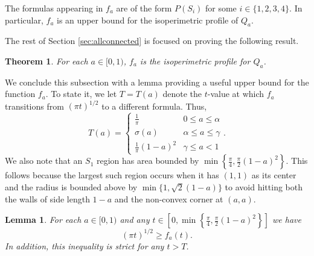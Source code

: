\documentclass[leqno]{article}
\numberwithin{equation}{section}
\newtheorem{theorem}[equation]{Theorem}
\theoremstyle{definition}
\theoremstyle{remark}
\theoremstyle{plain}
\newtheorem{lemma}[equation]{Lemma}
\begin{document}
The formulas appearing in $f_a$ are of the form $P(S_i)$ for some $i\in \{1,2,3,4\}$.  In particular, $f_a$ is an upper bound for the isoperimetric profile of $Q_a$.

The rest of Section \ref{sec:allconnected} is focused on proving the following result.

\begin{theorem}\label{thm:iso} For each $a\in [0,1)$, $f_a$ is the isoperimetric profile for $Q_a$.

\end{theorem}

We conclude this subsection with a lemma providing a useful upper bound for the function $f_a$. To state it, we let $T = T(a)$ denote the $t$-value at which $f_a$ transitions from $(\pi t)^{1/2}$ to a different formula.  Thus,
\[
    T(a) =
    \begin{cases}
        \frac{1}{\pi} & 0\leq a \leq \alpha \\
        \sigma (a) & \alpha \leq a \leq \gamma \\
        \frac{1}{\pi}(1-a)^2 & \gamma \leq a < 1
    \end{cases}.
\]
We also note that an $S_1$ region has area bounded by $\min\left\{\frac{\pi}{4}, \frac{\pi}{2}(1-a)^2\right\}$.  This follows because the largest such region occurs when it has $(1,1)$ as its center and the radius is bounded above by $\min\{1, \sqrt{2}(1-a)\}$ to avoid hitting both the walls of side length $1-a$ and the non-convex corner at $(a,a)$.




\begin{lemma}\label{lem:ffacts}For each $a\in [0,1)$ and any $t\in \left[0,\min\left\{\frac{\pi}{4}, \frac{\pi}{2}(1-a)^2\right\}\right]$ we have $$(\pi t)^{1/2} \geq f_a(t).$$  In addition, this inequality is strict for any $t> T$.

\end{lemma}
\end{document}

